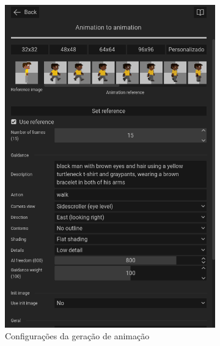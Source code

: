 \begin{figure}[htbp]
    \centering
    \caption{\small Processo da utilização 4 da ferramenta de animação do PixelLab em julho/2025}
    \label{fig:pixelLabAnimacao4}

    \begin{subfigure}{0.6\linewidth}
        \includegraphics[width=1\linewidth]{figs/pixelLab/dia3/tela_5.PNG}
        \caption{\small Configurações da geração de animação}
        \label{fig:pixelLabAnimacao4a}
    \end{subfigure}
    \begin{subfigure}{0.35\linewidth}

\end{subfigure}
\end{figure}
